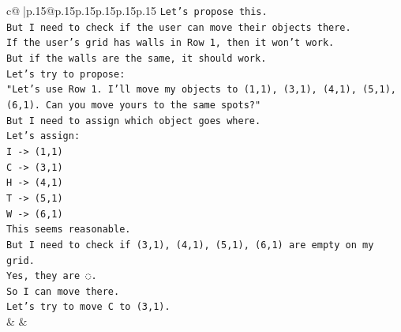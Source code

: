 \documentclass{article}
\begin{document}
{\begin{supertabular}{c@{$\;$}|p{.15\linewidth}@{}p{.15\linewidth}p{.15\linewidth}p{.15\linewidth}p{.15\linewidth}p{.15\linewidth}}
{{{\texttt{Let's propose this.} \\
\texttt{But I need to check if the user can move their objects there.} \\
\texttt{If the user's grid has walls in Row 1, then it won't work.} \\
\texttt{But if the walls are the same, it should work.} \\
\texttt{Let's try to propose:} \\
\texttt{"Let's use Row 1. I'll move my objects to (1,1), (3,1), (4,1), (5,1), (6,1). Can you move yours to the same spots?"} \\
\texttt{But I need to assign which object goes where.} \\
\texttt{Let's assign:} \\
\texttt{I {-}> (1,1)} \\
\texttt{C {-}> (3,1)} \\
\texttt{H {-}> (4,1)} \\
\texttt{T {-}> (5,1)} \\
\texttt{W {-}> (6,1)} \\
\texttt{This seems reasonable.} \\
\texttt{But I need to check if (3,1), (4,1), (5,1), (6,1) are empty on my grid.} \\
\texttt{Yes, they are ◌.} \\
\texttt{So I can move there.} \\
\texttt{Let's try to move C to (3,1).} \\
            }
        }
    }
    & & \\ \\


\end{supertabular}}
\end{document}
